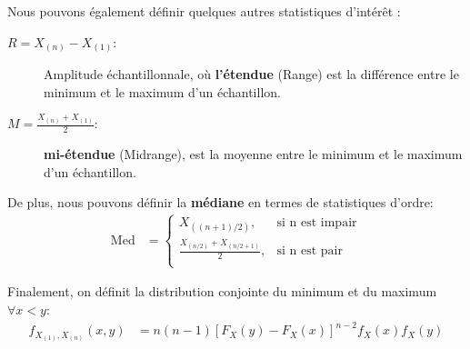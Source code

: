 \documentclass[10pt, french]{article}
\begin{document}
\begin{multicols*}{2}
Nous pouvons également définir quelques autres statistiques d'intérêt :

\begin{description}
	\item[$R = X_{(n)} - X_{(1)}$: ] Amplitude échantillonnale, où \textbf{l'étendue} (Range) est la différence entre le minimum et le maximum d'un échantillon.
	\item[$M = \frac{X_{(n)} + X_{(1)}}{2}$: ] \textbf{mi-étendue} (Midrange), est la moyenne entre le minimum et le maximum d'un échantillon.
\end{description}

De plus, nous pouvons définir la \textbf{médiane} en termes de statistiques d'ordre:
\begin{align*}
	\text{Med}
	&=	\left\{
		\begin{matrix}
			X_{((n + 1)/2)},		&	\text{si n est impair}	\\
			\frac{X_{(n/2)} + X_{(n/2 + 1)}}{2},	&	\text{si n est pair}	\\
		\end{matrix}
	\right.
\end{align*}

Finalement, on définit la distribution conjointe du minimum et du maximum $\forall x < y$:
\begin{align*}
	f_{X_{(1)}, X_{(n)}}(x, y)
	&=	n (n - 1) [F_{X}(y) - F_{X}(x)]^{n - 2} f_{X}(x) f_{X}(y)
\end{align*}

\end{multicols*}
\end{document}
